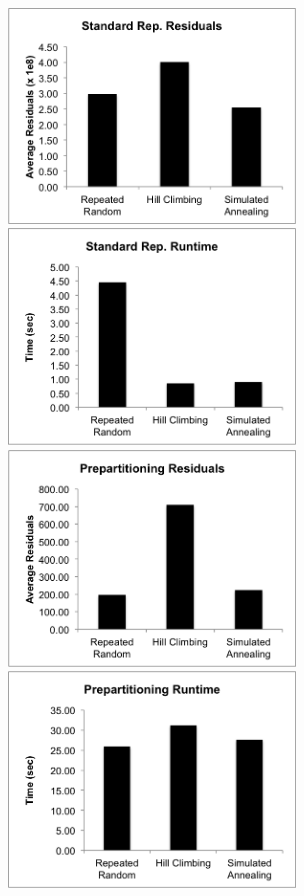\documentclass[a4paper]{article}
\begin{document}
	\includegraphics[width=3in]{ss_resid}
	\includegraphics[width=3in]{ss_time}\\
	\includegraphics[width=3in]{pp_resid}
	\includegraphics[width=3in]{pp_time}
	
\end{document}
